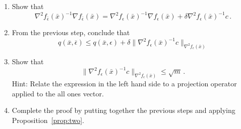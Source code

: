 \documentclass[12pt]{article}
\begin{document}
\begin{enumerate}
\item
Show that
\[
\nabla^2 f_{\bar\epsilon}(\bar x)^{-1}\nabla f_{\bar\epsilon}(\bar x)
= \nabla^2 f_{\epsilon}(\bar x)^{-1}\nabla f_{\epsilon}(\bar x)
+ \delta \nabla^2 f_\epsilon(\bar x)^{-1}c\,.
\]
\item
From the previous step, conclude that
\[
q(\bar x,\bar\epsilon)
\le q(\bar x,\epsilon) + 
\delta\|\nabla^2 f_\epsilon(\bar x)^{-1}c\|_{\nabla^2 f_\epsilon(\bar x)}
\]
\item
Show that
\[
\|\nabla^2 f_\epsilon(\bar x)^{-1}c\|_{\nabla^2 f_\epsilon(\bar x)}
\le \sqrt{m}\,.
\]
Hint: Relate the expression in the left hand side to a projection operator
applied to the all ones vector.
\item
Complete the proof by putting together the previous steps and applying
Proposition~\ref{prop:two}.
\end{enumerate}
\end{document}
